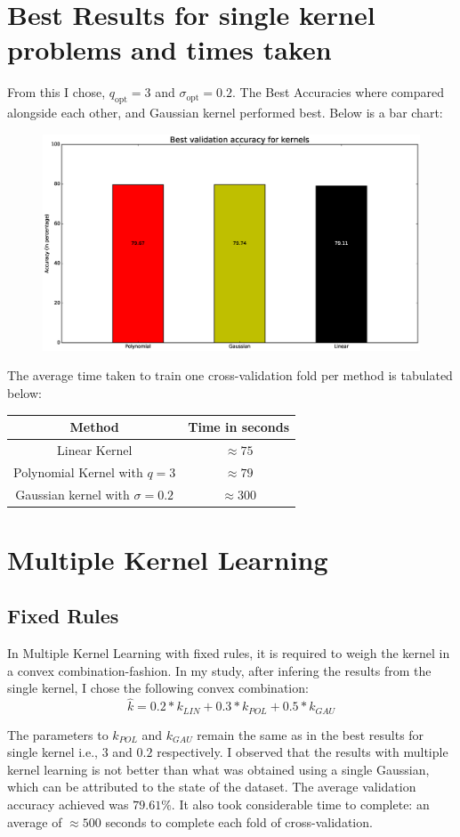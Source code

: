 \documentclass{article}
\begin{document}
\section*{Best Results for single kernel problems and times taken}
\begin{flushleft}
From this I chose, \(q_{\text{opt}} = 3\) and \(\sigma_{\text{opt}} = 0.2\). The Best Accuracies where compared alongside each other, and Gaussian kernel performed best. Below is a bar chart:
\begin{figure}[H]
\centering
\includegraphics[width=0.5\linewidth]{./images/comparison_3.eps}
\end{figure}

The average time taken to train one cross-validation fold per method is tabulated below:

\begin{center}
\begin{tabular}{|c|c|}
\hline
Method & Time in seconds \\
\hline
\hline
Linear Kernel & \(\approx 75\) \\
\hline
Polynomial Kernel with \(q = 3\) & \(\approx 79\) \\
\hline
Gaussian kernel with \(\sigma = 0.2\) & \(\approx 300\) \\
\hline
\end{tabular}
\end{center}
\end{flushleft}

\section*{Multiple Kernel Learning}
\subsection*{Fixed Rules}
\begin{flushleft}
In Multiple Kernel Learning with fixed rules, it is required to weigh the kernel in a convex combination-fashion. In my study, after infering the results from the single kernel, I chose the following convex combination:
\begin{equation*}
\hat{k} = 0.2*k_{LIN} + 0.3*k_{POL} + 0.5*k_{GAU}
\end{equation*}

The parameters to \(k_{POL}\) and \(k_{GAU}\) remain the same as in the best results for single kernel i.e., \(3\) and \(0.2\) respectively. I observed that the results with multiple kernel learning is not better than what was obtained using a single Gaussian, which can be attributed to the state of the dataset. The average validation accuracy achieved was \(79.61\%\). It also took considerable time to complete: an average of \(\approx 500\) seconds to complete each fold of cross-validation.
\end{flushleft}
\end{document}

